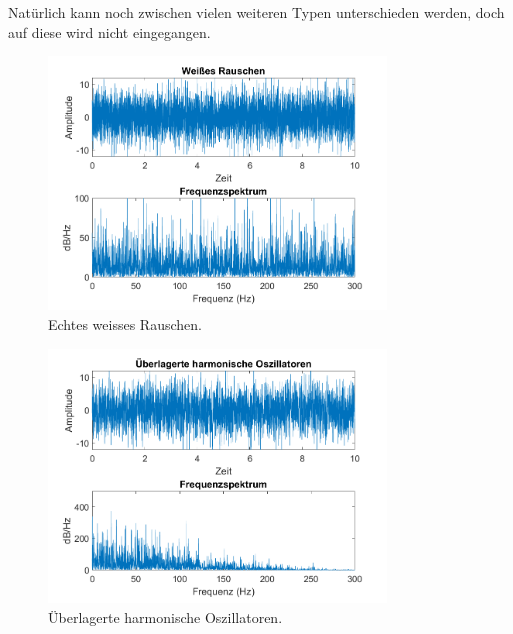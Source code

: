Natürlich kann noch zwischen vielen weiteren Typen unterschieden werden, doch auf diese wird nicht eingegangen.



\begin{figure}
	\centering
	\includegraphics[width=0.8\textwidth]{papers/brown/images/weissesRauschen-FFT.png}
	\caption{Echtes weisses Rauschen.}
	\label{brown:weissesRauschenSignal}
\end{figure}

\begin{figure}	
	\centering
	\includegraphics[width=0.8\textwidth]{papers/brown/images/harmonischeOszillatoren-FFT.png}
	\caption{Überlagerte harmonische Oszillatoren.}
	\label{brown:überlagerteSchwingungen}
\end{figure}


